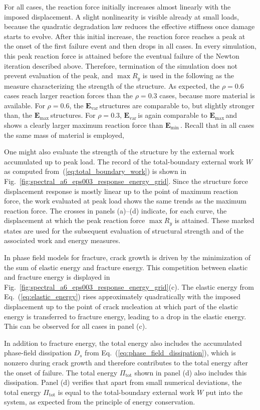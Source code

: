 \documentclass[
	pdflatex,
	sn-mathphys-num
]{sn-jnl}
\newcommand{\Evar}{\ensuremath{\mathbf{E}_{\text{var}}}{\,}}
\newcommand{\Emin}{\ensuremath{\mathbf{E}_{\text{min}}}{\,}}
\newcommand{\Emax}{\ensuremath{\mathbf{E}_{\text{max}}}{\,}}
\theoremstyle{thmstyleone}%
\theoremstyle{thmstyletwo}%
\theoremstyle{thmstylethree}%
\begin{document}
For all cases, the reaction force initially increases almost
linearly with the imposed displacement. A slight nonlinearity
is visible already at small loads, because the quadratic
degradation law reduces the effective stiffness once damage
starts to evolve. After this initial increase, the reaction
force reaches a peak at the onset of the first failure event
and then drops in all cases. In every simulation, this peak
reaction force is attained before the eventual failure of the
Newton iteration described above. Therefore, termination of
the simulation does not prevent evaluation of the peak, and
$\max R_y$ is used in the following as the measure
characterizing the strength of the structure.
As expected, the $\rho=0.6$ cases reach larger reaction forces
than the $\rho=0.3$ cases, because more material is available.
For $\rho=0.6$, the \Evar structures are comparable to, but
slightly stronger than, the \Emax structures. For $\rho=0.3$,
\Evar is again comparable to \Emax and shows a clearly larger
maximum reaction force than \Emin. Recall that in all cases the
same mass of material is employed,

One might also evaluate the strength of the structure by the external
work accumulated up to peak load. The record of the total-boundary
external work $W$ as computed from~(\ref{eq:total_boundary_work})
is shown in Fig.~\ref{fig:spectral_a6_eps003_response_energy_grid}.
Since the structure force displacement response is mostly linear up to the
point of maximum reaction force, the work evaluated at peak load shows the same
trends as the maximum reaction force.
The crosses in panels (a)--(d) indicate, for each curve, the
displacement at which the peak reaction force $\max R_y$ is
attained. These marked states are used for the subsequent
evaluation of structural strength and of the associated work
and energy measures.

In phase field models for fracture, crack growth is driven by
the minimization of the sum of elastic energy and fracture energy.
This competition between elastic and fracture energy is displayed in Fig.~\ref{fig:spectral_a6_eps003_response_energy_grid}(c).
The elastic energy from Eq.~(\ref{eq:elastic_energy}) rises approximately quadratically
with the imposed displacement up to the point of crack nucleation at which part of the
elastic energy is transferred to fracture energy,
leading to a drop in the elastic energy. This can be observed for all cases in panel (c).

In addition to fracture energy, the total energy also includes the accumulated
phase-field dissipation $D_s$ from Eq.~(\ref{eq:phase_field_dissipation}),
which is nonzero during crack growth and therefore
contributes to the total energy after the onset of failure. The
total energy $\Pi_\mathrm{tot}$ shown in panel (d) also
includes this dissipation.
Panel (d) verifies that apart from small numerical deviations,
the total energy $\Pi_\mathrm{tot}$ is equal to the total-boundary
external work $W$ put into the system, as expected from the principle
of energy conservation.
\end{document}

